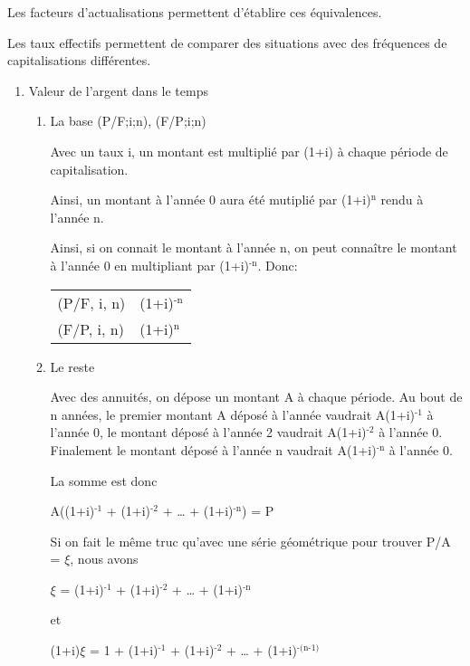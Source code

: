 \documentclass[11pt]{article}
\begin{document}
Les facteurs d'actualisations permettent d'établire ces équivalences.

Les taux effectifs permettent de comparer des situations avec des fréquences de
capitalisations différentes.
\begin{enumerate}
\item Valeur de l'argent dans le temps
\label{sec:org8b1827d}

\begin{enumerate}
\item La base (P/F;i;n), (F/P;i;n)
\label{sec:org2ab2330}

Avec un taux i, un montant est multiplié par (1+i) à chaque période de
capitalisation.

Ainsi, un montant à l'année 0 aura été mutiplié par (1+i)\(^{\text{n}}\) rendu à l'année n.

Ainsi, si on connait le montant à l'année n, on peut connaître le montant à
l'année 0 en multipliant par (1+i)\(^{\text{-n}}\).  Donc:

\begin{center}
\begin{tabular}{ll}
(P/F, i, n) & (1+i)\(^{\text{-n}}\)\\
(F/P, i, n) & (1+i)\(^{\text{n}}\)\\
\end{tabular}
\end{center}

\item Le reste
\label{sec:org1b55ef8}

Avec des annuités, on dépose un montant A à chaque période. Au bout de n années,
le premier montant A déposé à l'année vaudrait A(1+i)\(^{\text{-1}}\) à l'année 0, le montant
déposé à l'année 2 vaudrait A(1+i)\(^{\text{-2}}\) à l'année 0.  Finalement le montant déposé
à l'année n vaudrait A(1+i)\(^{\text{-n}}\) à l'année 0.

La somme est donc

A((1+i)\(^{\text{-1}}\) + (1+i)\(^{\text{-2}}\) + \dots{} + (1+i)\(^{\text{-n}}\)) = P

Si on fait le même truc qu'avec une série géométrique pour trouver P/A = \(\xi\), nous
avons

\(\xi\) = (1+i)\(^{\text{-1}}\) + (1+i)\(^{\text{-2}}\) + \dots{} + (1+i)\(^{\text{-n}}\)

et

(1+i)\(\xi\) = 1 + (1+i)\(^{\text{-1}}\) + (1+i)\(^{\text{-2}}\) + \dots{} + (1+i)\(^{\text{-(n-1)}}\) 


\end{enumerate}
\end{enumerate}
\end{document}
